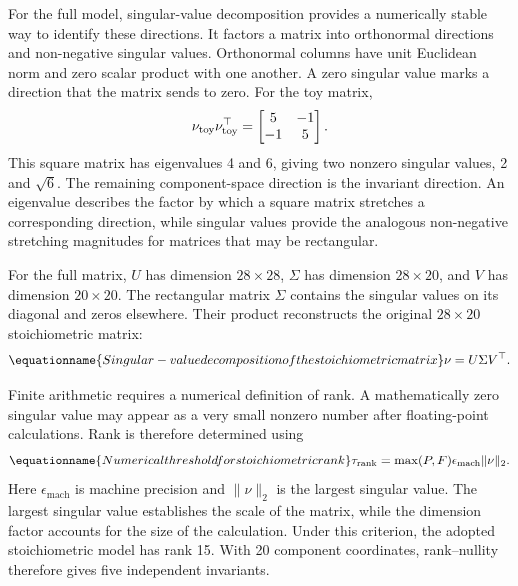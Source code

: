 For the full model, singular-value decomposition provides a numerically stable way to identify these directions. It factors a matrix into orthonormal directions and non-negative singular values. Orthonormal columns have unit Euclidean norm and zero scalar product with one another. A zero singular value marks a direction that the matrix sends to zero. For the toy matrix,
\[
\nu_{\rm toy}\nu_{\rm toy}^\top
=\begin{bmatrix}5&-1\\-1&5\end{bmatrix}.
\]
This square matrix has eigenvalues 4 and 6, giving two nonzero singular values, 2 and $\sqrt6$. The remaining component-space direction is the invariant direction. An eigenvalue describes the factor by which a square matrix stretches a corresponding direction, while singular values provide the analogous non-negative stretching magnitudes for matrices that may be rectangular.

For the full matrix, $U$ has dimension $28\times28$, $\Sigma$ has dimension $28\times20$, and $V$ has dimension $20\times20$. The rectangular matrix $\Sigma$ contains the singular values on its diagonal and zeros elsewhere. Their product reconstructs the original $28\times20$ stoichiometric matrix:
\begin{equation}
\equationname{Singular-value decomposition of the stoichiometric matrix}
\nu=U\Sigma V^\top.
\label{eq:stoichiometric_svd}
\end{equation}

Finite arithmetic requires a numerical definition of rank. A mathematically zero singular value may appear as a very small nonzero number after floating-point calculations. Rank is therefore determined using
\begin{equation}
\equationname{Numerical threshold for stoichiometric rank}
\tau_{\mathrm{rank}}=\max(P,F)\epsilon_{\mathrm{mach}}\|\nu\|_2.
\label{eq:stoichiometric_rank_threshold}
\end{equation}
Here $\epsilon_{\mathrm{mach}}$ is machine precision and $\|\nu\|_2$ is the largest singular value. The largest singular value establishes the scale of the matrix, while the dimension factor accounts for the size of the calculation. Under this criterion, the adopted stoichiometric model has rank 15. With 20 component coordinates, rank--nullity therefore gives five independent invariants.

